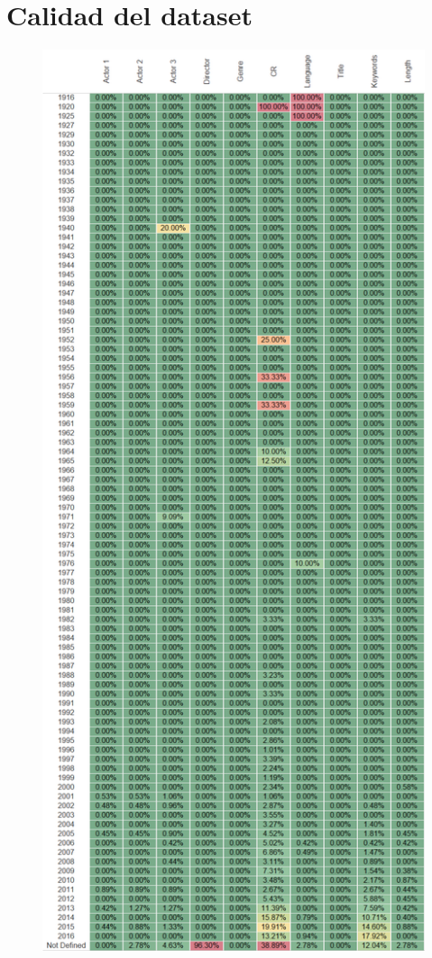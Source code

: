 \documentclass{article}
\begin{document}

\clearpage

\appendix


\section{Calidad del dataset}

\begin{figure}[h]
\centering
\includegraphics[height=0.78\textheight,clip,keepaspectratio]{./images/dataset_quality_dimensions}
\label{fig:imdb_num_films_per_year}
\end{figure}
\end{document}
